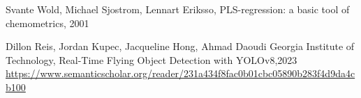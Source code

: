 \documentclass[12pt,a4paper,oneside]{book} %
\begin{document}
\begin{thebibliography}{99}




Svante Wold, Michael Sjostrom, Lennart Eriksso, PLS-regression: a basic tool of chemometrics, 2001


Dillon Reis, Jordan Kupec, Jacqueline Hong, Ahmad Daoudi Georgia Institute of Technology, Real-Time Flying Object Detection with YOLOv8,2023
\\\url{ https://www.semanticscholar.org/reader/231a434f8fac0b01cbc05890b283f4d9da4cb100}












\end{thebibliography}
\end{document}
